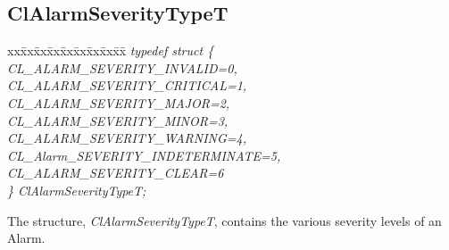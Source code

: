 \begin{flushleft}
\subsection{ClAlarmSeverityTypeT}
\begin{tabbing}
xx\=xx\=xx\=xx\=xx\=xx\=xx\=xx\=xx\=\kill
\textit{typedef struct \{}\\
\>\>\>\>\textit{CL\_ALARM\_SEVERITY\_INVALID=0,}\\
\>\>\>\>\textit{CL\_ALARM\_SEVERITY\_CRITICAL=1,}\\
\>\>\>\>\textit{CL\_ALARM\_SEVERITY\_MAJOR=2,}\\
\>\>\>\>\textit{CL\_ALARM\_SEVERITY\_MINOR=3,}\\
\>\>\>\>\textit{CL\_ALARM\_SEVERITY\_WARNING=4,}\\
\>\>\>\>\textit{CL\_Alarm\_SEVERITY\_INDETERMINATE=5,}\\
\>\>\>\>\textit{CL\_ALARM\_SEVERITY\_CLEAR=6}\\
\textit{\} ClAlarmSeverityTypeT;}\end{tabbing}
The structure, \textit{ClAlarmSeverityTypeT}, contains the various severity levels of an Alarm. 



\end{flushleft}
